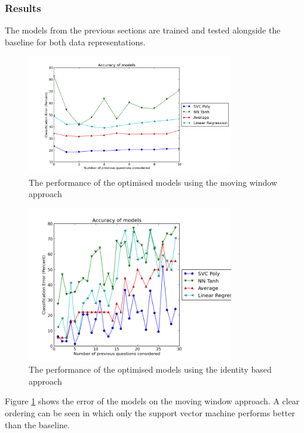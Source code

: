 \subsubsection{Results}
The models from the previous sections are trained and tested alongside the baseline for both data representations.

\begin{figure}[h!]
\centering
\includegraphics[width=0.8\textwidth]{images/finalmovingwindow.png}
\caption{The performance of the optimised models using the moving window approach}
\label{fig:finalmovingwindow}
\end{figure}

\begin{figure}[h!]
\centering
\includegraphics[width=0.8\textwidth]{images/finalidentified.png}
\caption{The performance of the optimised models using the identity based approach}
\label{fig:finalidentified}
\end{figure}

Figure \ref{fig:finalmovingwindow} shows the error of the models on the moving window approach. A clear ordering can be seen in which only the support vector machine performs better than the baseline. 

